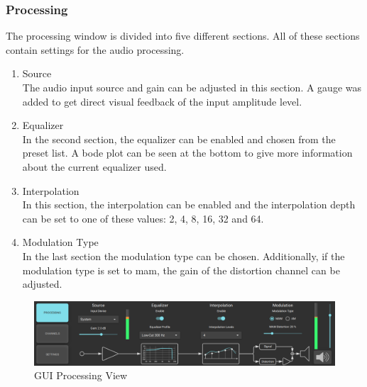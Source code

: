 \subsubsection{Processing}
The processing window is divided into five different sections. All of these sections contain settings for the audio processing.
\begin{enumerate}
    \item Source \\
    The audio input source and gain can be adjusted in this section. A gauge was added to get direct visual feedback of the input amplitude level.
    \item Equalizer \\
     In the second section, the equalizer can be enabled and chosen from the preset list. A bode plot can be seen at the bottom to give more information about the current equalizer used. 
    \item Interpolation \\
    In this section, the interpolation can be enabled and the interpolation depth can be set to one of these values: 2, 4, 8, 16, 32 and 64.
    \item Modulation Type \\
    In the last section the modulation type can be chosen. Additionally, if the modulation type is set to  \acrshort{mam}, the gain of the distortion channel can be adjusted. 
\end{enumerate}

\begin{figure}[h!]
    \centering
    \includegraphics[width=\textwidth]{images/4_Design/Software/Page_Processing.PNG}
    \caption{GUI Processing View}
    \label{4_fig:gui_processing}
\end{figure}

